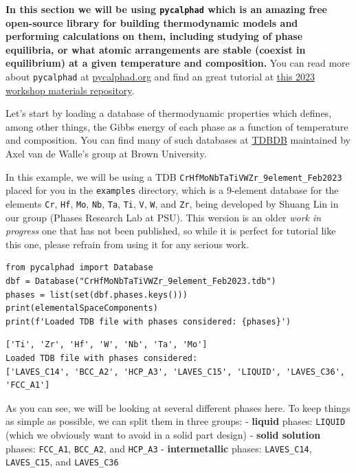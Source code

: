 \textbf{In this section we will be using
\texttt{pycalphad} which is an amazing free open-source
library for building thermodynamic models and performing calculations on
them, including studying of phase equilibria, or what atomic
arrangements are stable (coexist in equilibrium) at a given temperature
and composition.} You can read more about
\texttt{pycalphad} at
\href{https://pycalphad.org/}{pycalphad.org} and find an great tutorial
at
\href{https://github.com/materialsgenomefoundation/2023-workshop-material/tree/main/pycalphad}{this
2023 workshop materials repository}.

Let's start by loading a database of thermodynamic properties which
defines, among other things, the Gibbs energy of each phase as a
function of temperature and composition. You can find many of such
databases at \href{https://avdwgroup.engin.brown.edu}{TDBDB} maintained
by Axel van de Walle's group at Brown University.

In this example, we will be using a TDB
\texttt{CrHfMoNbTaTiVWZr\_9element\_Feb2023} placed for
you in the \texttt{examples} directory, which is a
9-element database for the elements \texttt{Cr},
\texttt{Hf}, \texttt{Mo},
\texttt{Nb}, \texttt{Ta},
\texttt{Ti}, \texttt{V},
\texttt{W}, and \texttt{Zr}, being
developed by Shuang Lin in our group (Phases Research Lab at PSU). This
wersion is an older \emph{work in progress} one that has not been
published, so while it is perfect for tutorial like this one, please
refrain from using it for any serious work.

\begin{verbatim}
from pycalphad import Database
dbf = Database("CrHfMoNbTaTiVWZr_9element_Feb2023.tdb")
phases = list(set(dbf.phases.keys()))
print(elementalSpaceComponents)
print(f'Loaded TDB file with phases considered: {phases}')
\end{verbatim}

\begin{verbatim}
['Ti', 'Zr', 'Hf', 'W', 'Nb', 'Ta', 'Mo']
Loaded TDB file with phases considered: 
['LAVES_C14', 'BCC_A2', 'HCP_A3', 'LAVES_C15', 'LIQUID', 'LAVES_C36', 'FCC_A1']
\end{verbatim}

As you can see, we will be looking at several different phases here. To
keep things as simple as possible, we can split them in three groups: -
\textbf{liquid} phases: \texttt{LIQUID} (which we
obviously want to avoid in a solid part design) - \textbf{solid
solution} phases: \texttt{FCC\_A1},
\texttt{BCC\_A2}, and \texttt{HCP\_A3}
- \textbf{intermetallic} phases: \texttt{LAVES\_C14},
\texttt{LAVES\_C15}, and
\texttt{LAVES\_C36}

